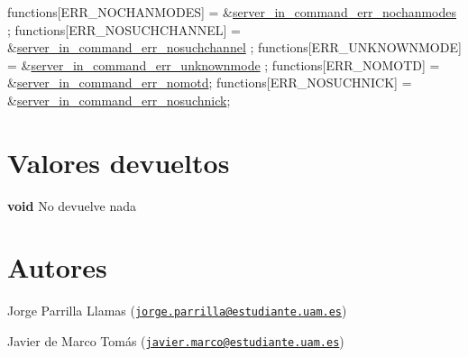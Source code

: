 \begin{DoxyCode}
functions[ERR\_NOCHANMODES]            = &\hyperlink{G-2313-06-P2__client__err__handlers_8h_aade31864807344a9961ffdab697b5727}{server\_in\_command\_err\_nochanmodes}
      ;
functions[ERR\_NOSUCHCHANNEL]          = &\hyperlink{G-2313-06-P2__client__err__handlers_8h_a83109e15e2a8f93c9523a84a546098c0}{server\_in\_command\_err\_nosuchchannel}
      ;
functions[ERR\_UNKNOWNMODE]            = &\hyperlink{G-2313-06-P2__client__err__handlers_8h_af262f3569e06c21e3e466266fa4e2c80}{server\_in\_command\_err\_unknownmode}
      ;
functions[ERR\_NOMOTD]                 = &\hyperlink{G-2313-06-P2__client__err__handlers_8h_a678f368edc1fd437f5f115ef897bdcd9}{server\_in\_command\_err\_nomotd};
functions[ERR\_NOSUCHNICK]             = &\hyperlink{G-2313-06-P2__client__err__handlers_8h_a01f8c9822aac18d5424ebbaf67c06a51}{server\_in\_command\_err\_nosuchnick};
\end{DoxyCode}
\hypertarget{client_execute_in_function_return_4}{}\section{Valores devueltos}\label{client_execute_in_function_return_4}

\begin{DoxyItemize}
\item {\bfseries void} No devuelve nada 
\end{DoxyItemize}\hypertarget{client_execute_in_function_authors_4}{}\section{Autores}\label{client_execute_in_function_authors_4}

\begin{DoxyItemize}
\item Jorge Parrilla Llamas (\href{mailto:jorge.parrilla@estudiante.uam.es}{\tt jorge.\+parrilla@estudiante.\+uam.\+es}) 
\item Javier de Marco Tomás (\href{mailto:javier.marco@estudiante.uam.es}{\tt javier.\+marco@estudiante.\+uam.\+es}) 
\end{DoxyItemize}